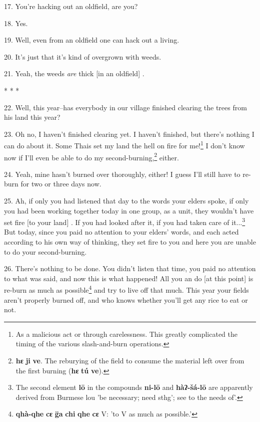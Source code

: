 17. You're hacking out an oldfield, are you?

18. Yes.

19. Well, even from an oldfield one can hack out a living.

20. It's just that it's kind of overgrown with weeds.

21. Yeah, the weeds \textit{are} thick [in an oldfield] .

\begin{center}
* * *
\end{center}

22. Well, this year--has everybody in our village finished clearing the trees from
his land this year?

23. Oh no, I haven't finished clearing yet. I haven't finished, but there's nothing
I can do about it. Some Thais set my land the hell on fire for me!\footnote{As a malicious act or through carelessness. This greatly complicated the timing of the various slash-and-burn operations.} I don't
know now if I'll even be able to do my second-burning,\footnote{\textbf{hɛ} \textbf{ji} \textbf{ve}. The reburying of the field to consume the material left over from the first burning (\textbf{hɛ} \textbf{tú} \textbf{ve}).} either.

24. Yeah, mine hasn't burned over thoroughly, either! I guess I'll still have to
re-burn for two or three days now.

25. Ah, if only you had listened that day to the words your elders spoke, if only
you had been working together today in one group, as a unit, they wouldn't have
set fire [to your land] . If you had looked after it, if you had taken care of
it...\footnote{The second element \textbf{lō} in the compounds \textbf{ni-lō} and \textbf{hàʔ-šá-lō} are apparently derived from Burmese lou 'be necessary; need sthg'; see to the needs of'.} But today, since you paid no attention to your elders' words, and each
acted according to his own way of thinking, they set fire to you and here you are
unable to do your second-burning.

26. There's nothing to be done. You didn't listen that time, you paid no attention
to what was said, and now this is what happened! All you an do [at this point]
is re-burn as much as possible\footnote{\textbf{qhà-qhe} \textbf{cɛ} \textbf{g̈a} \textbf{chi} \textbf{qhe} \textbf{cɛ} V: 'to V as much as possible.'} and try to live off that much. This year your
fields aren't properly burned off, and who knows whether you'll get any rice to
eat or not.

